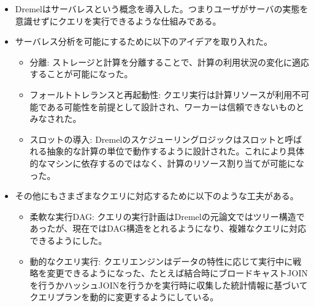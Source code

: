 \documentclass[dvipdfmx,uplatex]{jsarticle}
\theoremstyle{remark}
\newenvironment{method}[1]{
    \begin{tcolorbox}[
        colframe=green!50!black,
        colback=green!50!black!10!white,
        colbacktitle=green!50!black!40!white,
        coltitle=black,
        fonttitle=\bfseries,
        title={#1}
    ]
}{
    \end{tcolorbox}
}
\begin{document}
\begin{method}{サーバレスコンピューティング}
\begin{itemize}
    \item Dremelはサーバレスという概念を導入した。つまりユーザがサーバの実態を意識せずにクエリを実行できるような仕組みである。
    \item サーバレス分析を可能にするために以下のアイデアを取り入れた。
    \begin{itemize}
        \item 分離: ストレージと計算を分離することで、計算の利用状況の変化に適応することが可能になった。
        \item フォールトトレランスと再起動性: クエリ実行は計算リソースが利用不可能である可能性を前提として設計され、ワーカーは信頼できないものとみなされた。
        \item スロットの導入: Dremelのスケジューリングロジックはスロットと呼ばれる抽象的な計算の単位で動作するように設計された。これにより具体的なマシンに依存するのではなく、計算のリソース割り当てが可能になった。
    \end{itemize}
    \item その他にもさまざまなクエリに対応するために以下のような工夫がある。
    \begin{itemize}
        \item 柔軟な実行DAG: クエリの実行計画はDremelの元論文ではツリー構造であったが、現在ではDAG構造をとれるようになり、複雑なクエリに対応できるようにした。
        \item 動的なクエリ実行: クエリエンジンはデータの特性に応じて実行中に戦略を変更できるようになった、たとえば結合時にブロードキャストJOINを行うかハッシュJOINを行うかを実行時に収集した統計情報に基づいてクエリプランを動的に変更するようにしている。
    \end{itemize}
\end{itemize}
\end{method}
\end{document}
